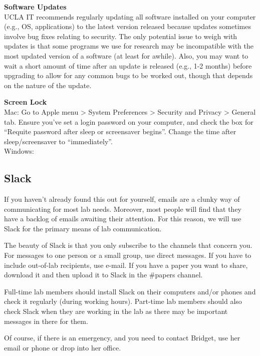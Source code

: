\documentclass[
]{book}
\begin{document}
\textbf{Software Updates}\\
UCLA IT recommends regularly updating all software installed on your computer (e.g., OS, applications) to the latest version released because updates sometimes involve bug fixes relating to security. The only potential issue to weigh with updates is that some programs we use for research may be incompatible with the most updated version of a software (at least for awhile). Also, you may want to wait a short amount of time after an update is released (e.g., 1-2 months) before upgrading to allow for any common bugs to be worked out, though that depends on the nature of the update.

\textbf{Screen Lock}\\
Mac: Go to Apple menu \textgreater{} System Preferences \textgreater{} Security and Privacy \textgreater{} General tab. Ensure you've set a login password on your computer, and check the box for ``Requite password after sleep or screensaver begins''. Change the time after sleep/screensaver to ``immediately''.\\
Windows:

\hypertarget{slack}{%
\subsection{Slack}\label{slack}}

If you haven't already found this out for yourself, emails are a clunky way of communicating for most lab needs. Moreover, most people will find that they have a backlog of emails awaiting their attention. For this reason, we will use Slack for the primary means of lab communication.

The beauty of Slack is that you only subscribe to the channels that concern you. For messages to one person or a small group, use direct messages. If you have to include out-of-lab recipients, use e-mail. If you have a paper you want to share, download it and then upload it to Slack in the \#papers channel.

Full-time lab members should install Slack on their computers and/or phones and check it regularly (during working hours). Part-time lab members should also check Slack when they are working in the lab as there may be important messages in there for them.

Of course, if there is an emergency, and you need to contact Bridget, use her email or phone or drop into her office.
\end{document}
